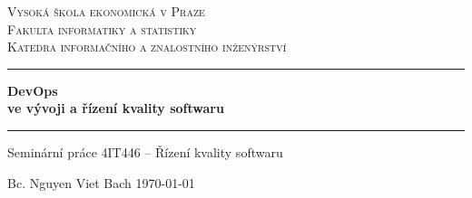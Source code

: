 \begin{titlepage}
\begin{center}

\textsc{\LARGE Vysoká škola ekonomická v Praze}\\[0.5cm]
\textsc{\large Fakulta informatiky a statistiky}\\[0.5cm]
\textsc{\large Katedra informačního a znalostního inženýrství}\\[0.5cm]

\vfill

\hrule
\vspace{0.4cm}
\huge {\bfseries DevOps\\ve vývoji a řízení kvality softwaru}
\vspace{0.4cm}
\hrule
\vspace{0.4cm}
\large Seminární práce 4IT446 -- Řízení kvality softwaru\\[0.3cm]

\vfill

\large Bc. Nguyen Viet Bach \hfill \today

\end{center}
\end{titlepage}
\restoregeometry

\newpage
